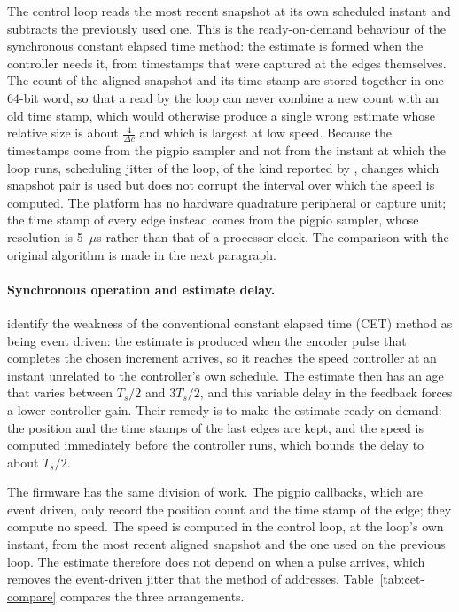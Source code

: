 The control loop reads the most recent snapshot at its own scheduled instant and subtracts the previously used one. This is the ready-on-demand behaviour of the synchronous constant elapsed time method: the estimate is formed when the controller needs it, from timestamps that were captured at the edges themselves. The count of the aligned snapshot and its time stamp are stored together in one 64-bit word, so that a read by the loop can never combine a new count with an old time stamp, which would otherwise produce a single wrong estimate whose relative size is about $\frac{4}{\Delta c}$ and which is largest at low speed. Because the timestamps come from the pigpio sampler and not from the instant at which the loop runs, scheduling jitter of the loop, of the kind reported by \citet{adam2021computers}, changes which snapshot pair is used but does not corrupt the interval over which the speed is computed. The platform has no hardware quadrature peripheral or capture unit; the time stamp of every edge instead comes from the pigpio sampler, whose resolution is 5~$\mu$s rather than that of a processor clock. The comparison with the original algorithm is made in the next paragraph.

\paragraph{Synchronous operation and estimate delay.}
\citet{anuchin2019} identify the weakness of the conventional constant elapsed time (CET) method as being event driven: the estimate is produced when the encoder pulse that completes the chosen increment arrives, so it reaches the speed controller at an instant unrelated to the controller's own schedule. The estimate then has an age that varies between $T_s/2$ and $3T_s/2$, and this variable delay in the feedback forces a lower controller gain. Their remedy is to make the estimate ready on demand: the position and the time stamps of the last edges are kept, and the speed is computed immediately before the controller runs, which bounds the delay to about $T_s/2$.

The firmware has the same division of work. The pigpio callbacks, which are event driven, only record the position count and the time stamp of the edge; they compute no speed. The speed is computed in the control loop, at the loop's own instant, from the most recent aligned snapshot and the one used on the previous loop. The estimate therefore does not depend on when a pulse arrives, which removes the event-driven jitter that the method of \citet{anuchin2019} addresses. Table~\ref{tab:cet-compare} compares the three arrangements.

